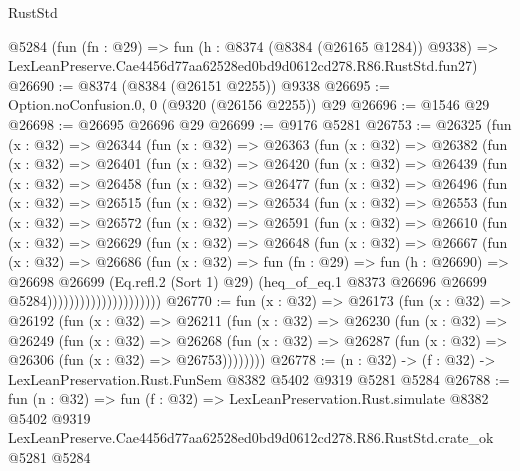 \begin{lexlean}{RustStd}
\begin{coremodule}
    @5284
    (fun (fn : @29) =>
    fun (h : @8374 (@8384 (@26165 @1284)) @9338) =>
    LexLeanPreserve.Cae4456d77aa62528ed0bd9d0612cd278.R86.RustStd.fun27)
@26690 := @8374 (@8384 (@26151 @2255)) @9338
@26695 := Option.noConfusion.{0, 0} (@9320 (@26156 @2255)) @29
@26696 := @1546 @29
@26698 := @26695 @26696 @29
@26699 := @9176 @5281
@26753 := @26325
    (fun (x : @32) =>
    @26344
      (fun (x : @32) =>
      @26363
        (fun (x : @32) =>
        @26382
          (fun (x : @32) =>
          @26401
            (fun (x : @32) =>
            @26420
              (fun (x : @32) =>
              @26439
                (fun (x : @32) =>
                @26458
                  (fun (x : @32) =>
                  @26477
                    (fun (x : @32) =>
                    @26496
                      (fun (x : @32) =>
                      @26515
                        (fun (x : @32) =>
                        @26534
                          (fun (x : @32) =>
                          @26553
                            (fun (x : @32) =>
                            @26572
                              (fun (x : @32) =>
                              @26591
                                (fun (x : @32) =>
                                @26610
                                  (fun (x : @32) =>
                                  @26629
                                    (fun (x : @32) =>
                                    @26648
                                      (fun (x : @32) =>
                                      @26667
                                        (fun (x : @32) =>
                                        @26686
                                          (fun (x : @32) =>
                                          fun (fn : @29) =>
                                          fun (h : @26690) =>
                                          @26698
                                            @26699
                                            (Eq.refl.{2} (Sort 1) @29)
                                            (heq_of_eq.{1}
                                              @8373
                                              @26696
                                              @26699
                                              @5284)))))))))))))))))))))
@26770 := fun (x : @32) =>
  @26173
    (fun (x : @32) =>
    @26192
      (fun (x : @32) =>
      @26211
        (fun (x : @32) =>
        @26230
          (fun (x : @32) =>
          @26249
            (fun (x : @32) =>
            @26268
              (fun (x : @32) => @26287 (fun (x : @32) => @26306 (fun (x : @32) => @26753))))))))
@26778 := (n : @32) -> (f : @32) -> LexLeanPreservation.Rust.FunSem @8382 @5402 @9319 @5281 @5284
@26788 := fun (n : @32) =>
  fun (f : @32) =>
  LexLeanPreservation.Rust.simulate
    @8382
    @5402
    @9319
    LexLeanPreserve.Cae4456d77aa62528ed0bd9d0612cd278.R86.RustStd.crate_ok
    @5281
    @5284
\end{coremodule}
\end{lexlean}
